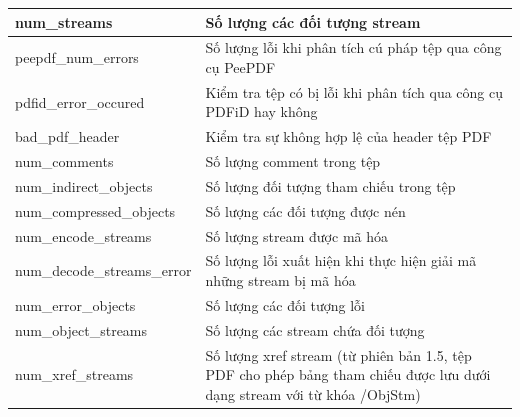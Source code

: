 \documentclass[./../main.tex]{subfiles}
\begin{document}
\begin{longtable}[c]{|p{}|p{}|}
	num\_streams                              & Số lượng các đối tượng stream                                                                                               \\ \hline
	peepdf\_num\_errors                       & Số lượng lỗi khi phân tích cú pháp tệp qua công cụ PeePDF                                                                   \\ \hline
	pdfid\_error\_occured                     & Kiểm tra tệp có bị lỗi khi phân tích qua công cụ PDFiD hay không                                                            \\ \hline
	bad\_pdf\_header                          & Kiểm tra sự không hợp lệ của header tệp PDF                                                                                 \\ \hline
	num\_comments                             & Số lượng comment trong tệp                                                                                                  \\ \hline
	num\_indirect\_objects                    & Số lượng đối tượng tham chiếu trong tệp                                                                                     \\ \hline
	num\_compressed\_objects                  & Số lượng các đối tượng được nén                                                                                             \\ \hline
	num\_encode\_streams                      & Số lượng stream được mã hóa                                                                                                 \\ \hline
	num\_decode\_streams\_error               & Số lượng lỗi xuất hiện khi thực hiện giải mã những stream bị mã hóa                                                         \\ \hline
	num\_error\_objects                       & Số lượng các đối tượng lỗi                                                                                                  \\ \hline
	num\_object\_streams                      & Số lượng các stream chứa đối tượng                                                                                          \\ \hline
	num\_xref\_streams                        & Số lượng xref stream (từ phiên bản 1.5, tệp PDF cho phép bảng tham chiếu được lưu dưới dạng stream với từ khóa /ObjStm)     \\ \hline

\end{longtable}
\end{document}
